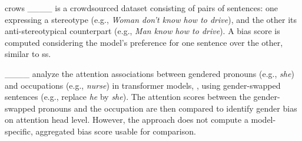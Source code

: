 \gls{crows} ____ is a crowdsourced dataset consisting of pairs of sentences: one expressing a stereotype (e.g., \emph{Woman don't know how to drive}), and the other its anti-stereotypical counterpart (e.g., \emph{Man know how to drive}). A bias score is computed considering the model's preference for one sentence over the other, similar to \gls{ss}. 


____ analyze the attention associations between gendered pronouns (e.g., \emph{she}) and occupations (e.g., \emph{nurse}) in transformer models, , using gender-swapped sentences (e.g., replace \emph{he} by \emph{she}). The attention scores between the gender-swapped pronouns and the occupation are then compared to identify gender bias on attention head level. However, the approach does not compute a model-specific, aggregated bias score usable for comparison.